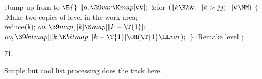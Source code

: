 \Y\B\4:Jump up from  to \X${}\E{}$\6
$\|o,\39\\{var}\K\\{map}[\\{kk}];{}$\6
\&{for} ${}(\|k\K\\{kk};{}$ ${}\|k>\\{jj};{}$ ${}\|k\MM){}$\5
${}\{{}$\1\6
:Make two copies of level  in the work area\X;\6
\\{reduce}(\|k);\6
${}\\{oo},\39\\{map}[\|k]\K\\{map}[\|k-\T{1}];{}$\6
${}\\{oo},\39\\{bitmap}[\|k]\K\\{bitmap}[\|k-\T{1}]\OR(\T{1}\LL\\{var});{}$\6
\4${}\}{}$\2\6
:Remake level \X;\par
\U21.\fi

Simple but cool list processing does the trick here.

